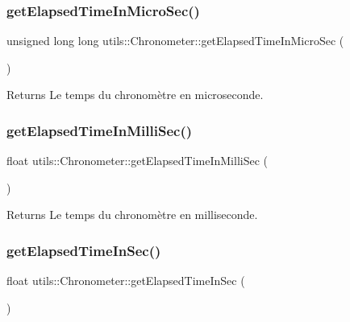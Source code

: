 \subsubsection{\texorpdfstring{get\+Elapsed\+Time\+In\+Micro\+Sec()}{getElapsedTimeInMicroSec()}}
{\footnotesize\ttfamily unsigned long long utils\+::\+Chronometer\+::get\+Elapsed\+Time\+In\+Micro\+Sec (\begin{DoxyParamCaption}{ }\end{DoxyParamCaption})}

\begin{DoxyReturn}{Returns}
Le temps du chronomètre en microseconde. 
\end{DoxyReturn}
\mbox{\label{classutils_1_1Chronometer_aecf9f2e3ced9629be0a03b3ecf0ee01a}} 
\subsubsection{\texorpdfstring{get\+Elapsed\+Time\+In\+Milli\+Sec()}{getElapsedTimeInMilliSec()}}
{\footnotesize\ttfamily float utils\+::\+Chronometer\+::get\+Elapsed\+Time\+In\+Milli\+Sec (\begin{DoxyParamCaption}{ }\end{DoxyParamCaption})}

\begin{DoxyReturn}{Returns}
Le temps du chronomètre en milliseconde. 
\end{DoxyReturn}
\mbox{\label{classutils_1_1Chronometer_a935aa20dd1791cfc8aec203a8838598d}} 
\subsubsection{\texorpdfstring{get\+Elapsed\+Time\+In\+Sec()}{getElapsedTimeInSec()}}
{\footnotesize\ttfamily float utils\+::\+Chronometer\+::get\+Elapsed\+Time\+In\+Sec (\begin{DoxyParamCaption}{ }\end{DoxyParamCaption})}

